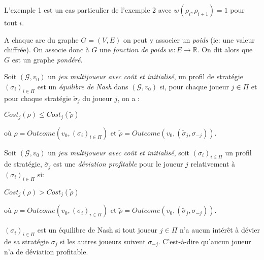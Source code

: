 \begin{rem}
	L'exemple 1 est un cas particulier de l'exemple 2 avec $w(\rho_{i},\rho_{i+1}) = 1$ pour tout $i$.
\end{rem}

\begin{defi}
	\label{def:fonctionPoids}
	A chaque arc du graphe $G = (V,E)$ on peut y associer un \textit{poids} (ie: une valeur chiffrée). On associe donc à $G$ une \textit{fonction de poids}  $w : E \rightarrow \mathbb{R}$. On dit alors que $G$ est un graphe \textit{pondéré}.
\end{defi}





\begin{defi}
	
	Soit $(\mathcal{G}, v_{0})$ un \textit{jeu multijoueur avec coût et initialisé}, un profil de stratégie $(\sigma _{i})_{i \in \Pi}$ est un \textit{équilibre de Nash} dans $(\mathcal{G}, v_{0})$ si, pour chaque joueur $j \in \Pi$ et pour chaque stratégie $\tilde{\sigma}_{j}$ du joueur $j$, on a :
	\begin{center}$ Cost_{j}(\rho) \leq Cost_{j}(\tilde{\rho})$ \end{center}
	où $\rho = Outcome(v_{0},(\sigma _{i})_{i \in \Pi})$ et $\tilde{\rho} = Outcome(v_{0}, (\tilde{\sigma} _{j} ,\sigma _{-j}))$.
\end{defi}	



\begin{defi}
	
	Soit $(\mathcal{G}, v_{0})$ un \textit{jeu multijoueur avec coût et initialisé}, soit $(\sigma _{i})_{i \in \Pi}$ un profil de stratégie, $\tilde{\sigma _{j}}$ est une \textit{déviation profitable} pour le joueur $j$ relativement à $(\sigma _{i})_{i \in \Pi}$ si:
	\begin{center} $ Cost_{j}(\rho) > Cost_{j}(\tilde{\rho})$ \end{center}
	où $\rho = Outcome(v_{0},(\sigma _{i})_{i \in \Pi})$ et $\tilde{\rho} = Outcome(v_{0}, (\tilde{\sigma} _{j} ,\sigma _{-j}))$. 
\end{defi}

\begin{rem}
	$(\sigma _{i})_{i\in \Pi}$ est un équilibre de Nash si tout joueur $j \in \Pi$ n'a aucun intérêt à dévier de sa stratégie $\sigma _{j}$ si les autres joueurs suivent $\sigma _{-j}$. C'est-à-dire qu'aucun joueur n'a de déviation profitable. 
\end{rem}


\begin{exemple}
\end{exemple}